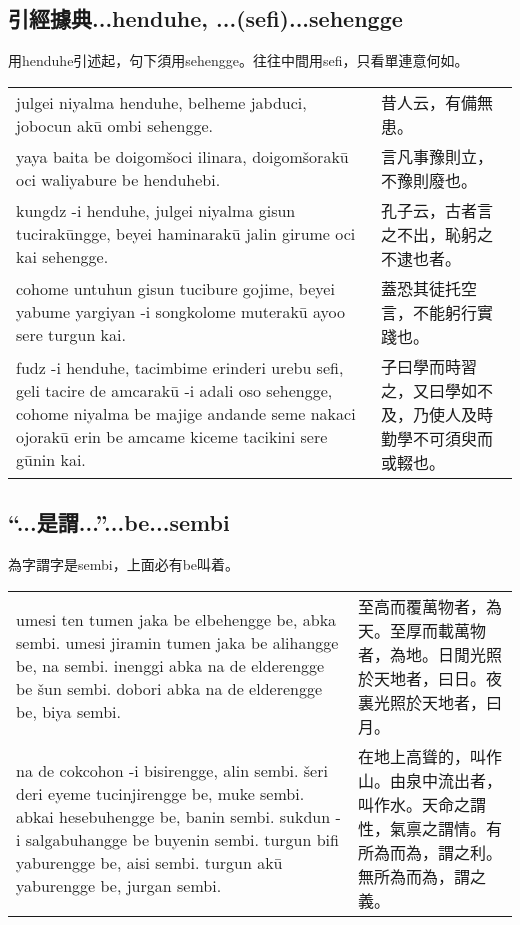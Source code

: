 \documentclass{article}
\begin{document}
\subsection{引經據典...henduhe, ...(sefi)...sehengge}
\noindent 用henduhe引述起，句下須用sehengge。往往中間用sefi，只看單連意何如。
\begin{center}
    \begin{tabularx}{\textwidth}{XX}
        julgei niyalma henduhe, belheme jabduci, jobocun ak\={u} ombi sehengge. & 昔人云，有備無患。\\
        yaya baita be doigom\v{s}oci ilinara, doigom\v{s}orak\={u} oci waliyabure be henduhebi. & 言凡事豫則立，不豫則廢也。\\
        kungdz -i henduhe, julgei niyalma gisun tucirak\={u}ngge, beyei haminarak\={u} jalin girume oci kai sehengge. & 孔子云，古者言之不出，恥躬之不逮也者。\\
        cohome untuhun gisun tucibure gojime, beyei yabume yargiyan -i songkolome muterak\={u} ayoo sere turgun kai. & 蓋恐其徒托空言，不能躬行實踐也。\\
        fudz -i henduhe, tacimbime erinderi urebu sefi, geli tacire de amcarak\={u} -i adali oso sehengge, cohome niyalma be majige andande seme nakaci ojorak\={u} erin be amcame kiceme tacikini sere g\={u}nin kai. & 子曰學而時習之，又曰學如不及，乃使人及時勤學不可須臾而或輟也。\\
    \end{tabularx}
\end{center}

\subsection{“...是謂...”...be...sembi}
\noindent 為字謂字是sembi，上面必有be叫着。
\begin{center}
    \begin{tabularx}{\textwidth}{XX}
        umesi ten tumen jaka be elbehengge be, abka sembi. umesi jiramin tumen jaka be alihangge be, na sembi. inenggi abka na de elderengge be \v{s}un sembi. dobori abka na de elderengge be, biya sembi.&至高而覆萬物者，為天。至厚而載萬物者，為地。日閒光照於天地者，曰日。夜裏光照於天地者，曰月。\\
        na de cokcohon -i bisirengge, alin sembi. \v{s}eri deri eyeme tucinjirengge be, muke sembi. abkai hesebuhengge be, banin sembi. sukdun -i salgabuhangge be buyenin sembi. turgun bifi yaburengge be, aisi sembi. turgun ak\={u} yaburengge be, jurgan sembi.& 在地上高聳的，叫作山。由泉中流出者，叫作水。天命之謂性，氣禀之謂情。有所為而為，謂之利。無所為而為，謂之義。
    \end{tabularx}
\end{center}
\end{document}
